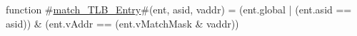function #\hyperref[sailRISCVzmatchzyTLBzyEntry]{match\_TLB\_Entry}#(ent, asid, vaddr) =
  (ent.global | (ent.asid == asid)) & (ent.vAddr == (ent.vMatchMask & vaddr))
